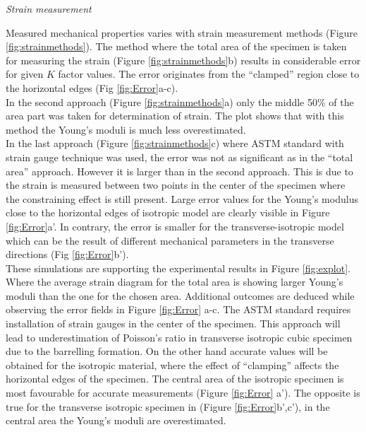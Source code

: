 \documentclass[review]{elsarticle}
\begin{document}
\begin{description}
\item{\textit{Strain measurement}}
\end{description}
Measured mechanical properties varies with strain measurement methods
(Figure \ref{fig:strainmethods}). The method where the total area of the
specimen is taken for measuring the strain (Figure \ref{fig:strainmethods}b)
results in considerable error for given $K$ factor values. The error originates
from the ``clamped'' region close to the horizontal edges (Fig
\ref{fig:Error}a-c).  \\
In the second approach (Figure \ref{fig:strainmethods}a)
only the middle 50\% of the area part was
taken for determination of strain. The plot shows that with this method the
Young's moduli is much less overestimated.  \\
In the last approach (Figure \ref{fig:strainmethods}c) where ASTM standard with
strain gauge technique was used, the error was not as significant as in the
``total area'' approach.
However it is larger than in the second approach. This is due to the
strain is measured between two points in the center of the specimen where
the constraining effect is still present. Large error values for the Young's
modulus close to the horizontal edges of isotropic model are clearly visible in
Figure \ref{fig:Error}a'. In contrary, the error is smaller for the
transverse-isotropic model which can be the result of different mechanical parameters in the
transverse directions (Fig \ref{fig:Error}b'). \\
These simulations are supporting the experimental results in Figure
\ref{fig:explot}. Where the average strain diagram for the total area is showing larger Young's moduli than
the one for the chosen area.
Additional outcomes are deduced  while observing the error fields in Figure
\ref{fig:Error} a-c. The ASTM standard \cite{american2009standard} requires
installation of strain gauges in the center of the specimen. This approach will
lead to underestimation of Poisson's ratio in transverse isotropic cubic
specimen due to the barrelling formation. On the other hand accurate values will
be obtained for the isotropic material, where the effect of ``clamping'' affects
the horizontal edges of the specimen. The central area of the isotropic specimen
is most favourable for accurate measurements (Figure
\ref{fig:Error} a'). The opposite is true for the transverse isotropic specimen
in (Figure \ref{fig:Error}b',c'), in the central area the Young's moduli are overestimated.
\end{document}

